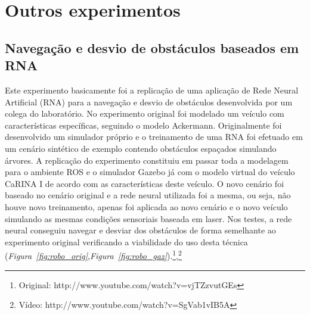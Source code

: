 \documentclass{article}
\newcommand{\foot}[1]{\footnote{	\fontfamily{cmss}\selectfont\footnotesize{#1}}}
\newcommand{\fig}[1]{\textit{Figura~\ref{#1}}}
\begin{document}
\section{Outros experimentos}

\subsection{Navegação e desvio de obstáculos baseados em RNA}

Este experimento basicamente foi a replicação de uma aplicação de Rede Neural
Artificial (RNA) para a navegação e desvio de obstáculos desenvolvida por um
colega do laboratório. No experimento original foi modelado um veículo com
características específicas, seguindo o modelo Ackermann. Originalmente foi
desenvolvido um simulador próprio e o treinamento de uma RNA foi efetuado em um
cenário sintético de exemplo contendo obstáculos espaçados simulando árvores. A
replicação do experimento constituiu em passar toda a modelagem para o ambiente
ROS e o simulador Gazebo já com o modelo virtual do veículo CaRINA I de acordo
com as características deste veículo. O novo cenário foi baseado no cenário
original e a rede neural utilizada foi a mesma, ou seja, não houve novo
treinamento, apenas foi aplicada ao novo cenário e o novo veículo simulando as
mesmas condições sensoriais baseada em laser. Nos testes, a rede neural
conseguiu navegar e desviar dos obstáculos de forma semelhante ao experimento
original verificando a viabilidade do uso desta técnica
(\fig{fig:robo_orig},\fig{fig:robo_gaz}).\foot{Original:
http://www.youtube.com/watch?v=vjTZzvutGEs},\foot{Vídeo:
http://www.youtube.com/watch?v=SgVab1vIB5A}
\end{document}
